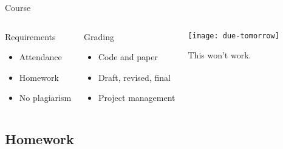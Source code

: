 \documentclass[t]{beamer}
\begin{document}
  \begin{frame}[t]{Course }

  \begin{columns}[T]


    \begin{block}{Requirements}
      \begin{itemize}
        \item Attendance
        \item Homework
        \item No plagiarism
      \end{itemize}
    \end{block}
  
    \begin{alertblock}{Grading}
      \begin{itemize}
        \item Code and paper
        \item Draft, revised, final
        \item Project management
      \end{itemize}
    \end{alertblock}


    \begin{center}
      \texttt{[image: due-tomorrow]}\vspace{1em}
      
      This won't work.
    \end{center}

  \end{columns} 
    
  \end{frame}

  \subsection{Homework}
  
\end{document}
